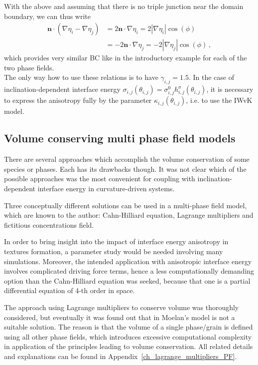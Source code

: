 	With the above and assuming that there is no triple junction near the domain boundary, we can thus write
	\begin{equation}
		\begin{split}
			\bm{n}\cdot(\nabla\eta_i-\nabla\eta_j) &= 2\bm{n}\cdot\nabla\eta_i = 2|\nabla\eta_i|\cos(\phi) \\ &= -2\bm{n}\cdot\nabla\eta_j = -2|\nabla\eta_j|\cos(\phi) \,,
		\end{split}
	\end{equation}
	which provides very similar BC like in the introductory example for each of the two phase fields.\\
	The only way how to use these relations is to have $\gamma_{i,j}=1.5$. In the case of inclination-dependent interface energy $\sigma_{i,j}(\theta_{i,j})=\sigma_{i,j}^0h_{i,j}^\sigma(\theta_{i,j})$, it is necessary to express the anisotropy fully by the parameter $\kappa_{i,j}(\theta_{i,j})$, i.e. to use the IWvK model.
	
	\subsection{Volume conserving multi phase field models}\label{sec_volume_cons_PF_ch_NPA_PF}
	There are several approaches which accomplish the volume conservation of some species or phases. Each has its drawbacks though. It was not clear which of the possible approaches was the most convenient for coupling with inclination-dependent interface energy in curvature-driven systems.
	
	Three conceptually different solutions can be used in a multi-phase field model, which are known to the author: Cahn-Hilliard equation, Lagrange multipliers and fictitious concentrations field. 
	
	In order to bring insight into the impact of interface energy anisotropy in textures formation, a parameter study would be needed involving many simulations. Moreover, the intended application with anisotropic interface energy involves complicated driving force terms, hence a less computationally demanding option than the Cahn-Hilliard equation was seeked, because that one is a partial differential equation of 4-th order in space. 
	
	The approach using Lagrange multipliers to conserve volume was thoroughly considered, but eventually it was found out that in Moelan's model is not a suitable solution. The reason is that the volume of a single phase/grain is defined using all other phase fields, which introduces excessive computational complexity in application of the principles leading to volume conservation. All related details and explanations can be found in Appendix~\ref{ch_lagrange_multipliers_PF}.
	
